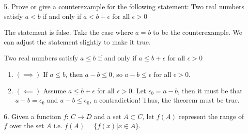5. Prove or give a counterexample for the following statement: Two real numbers
satisfy $a < b$ if and only if $a < b + \epsilon$ for all $\epsilon > 0$

The statement is false. Take the case where $a=b$ to be the counterexample. We can adjust the statement slightly to make it true. 

\begin{theorem}
Two real numbers satisfy $a \le b$ if and only if $a \le  b + \epsilon$ for all $\epsilon > 0$	
\end{theorem}

\begin{enumerate}
	\item $\left( \implies \right) $ If $a \le  b$, then $a - b \le  0$, so $a - b \le  \epsilon$ for all $\epsilon > 0$.
	\item $\left( \impliedby \right) $ Assume $a \le  b + \epsilon$ for all $\epsilon > 0$. Let $\epsilon_0 = a - b$, then it must be that $a - b = \epsilon_0$ and $a - b \le  \epsilon_0$, a contradiction! Thus, the theorem must be true.
 
\end{enumerate}

6. Given a function $f \text{: } C \to D$ and a set $A \subset C$, let $f\left( A \right) $ represent the range of $f$ over the set $A$ i.e. $f\left( A \right)  = \{f\left( x \right)  | x \in A\}$.



